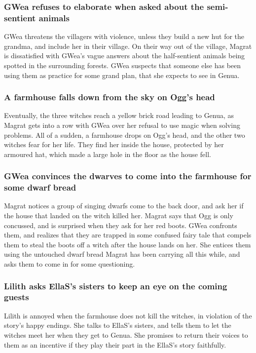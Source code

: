 \subsubsection{\Gls{GWea} refuses to elaborate when asked about the semi-sentient animals}
\Gls{GWea} threatens the villagers with violence, unless they build a new hut for the grandma, and
include her in their village. On their way out of the village, \Gls{Magrat} is dissatisfied with
\Gls{GWea}'s vague answers about the half-sentient animals being spotted in the surrounding forests.
\Gls{GWea} suspects that someone else has been using them as practice for some grand plan, that she
expects to see in Genua.

\subsubsection{A farmhouse falls down from the sky on \Gls{Ogg}'s head}
Eventually, the three witches reach a yellow brick road leading to Genua, as \Gls{Magrat} gets into
a row with \Gls{GWea} over her refusal to use magic when solving problems. All of a sudden, a
farmhouse drops on \Gls{Ogg}'s head, and the other two witches fear for her life. They find her
inside the house, protected by her armoured hat, which made a large hole in the floor as the house
fell.

\subsubsection{\Gls{GWea} convinces the dwarves to come into the farmhouse for some dwarf bread}
\Gls{Magrat} notices a group of singing dwarfs come to the back door, and ask her if the house
that landed on the witch killed her. \Gls{Magrat} says that \Gls{Ogg} is only concussed, and is
surprised when they ask for her red boots. \Gls{GWea} confronts them, and realizes that they are
trapped in some confused fairy tale that compels them to steal the boots off a witch after the
house lands on her. She entices them using the untouched dwarf bread \Gls{Magrat} has been
carrying all this while, and asks them to come in for some questioning.

\subsubsection{\Gls{Lilith} asks \Gls{EllaS}'s sisters to keep an eye on the coming guests}
\Gls{Lilith} is annoyed when the farmhouse does not kill the witches, in violation of the story's
happy endings. She talks to \Gls{EllaS}'s sisters, and tells them to let the witches meet her when
they get to Genua. She promises to return their voices to them as an incentive if they play their
part in the \Gls{EllaS}'s story faithfully.

